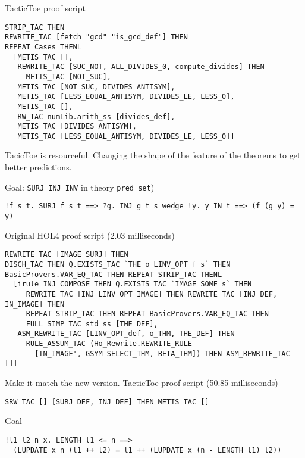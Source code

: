 \documentclass[runningheads,a4paper,draft]{svjour3}
\def\holfour{\textsf{HOL4}\xspace}
\def\tactictoe{\textsf{TacticToe}\xspace}
\begin{document}
\vspace{5mm}

\tactictoe proof script
\begin{lstlisting}[language=SMLSmall,frame=tb]
STRIP_TAC THEN 
REWRITE_TAC [fetch "gcd" "is_gcd_def"] THEN 
REPEAT Cases THENL 
  [METIS_TAC [], 
   REWRITE_TAC [SUC_NOT, ALL_DIVIDES_0, compute_divides] THEN 
     METIS_TAC [NOT_SUC], 
   METIS_TAC [NOT_SUC, DIVIDES_ANTISYM], 
   METIS_TAC [LESS_EQUAL_ANTISYM, DIVIDES_LE, LESS_0], 
   METIS_TAC [], 
   RW_TAC numLib.arith_ss [divides_def], 
   METIS_TAC [DIVIDES_ANTISYM],
   METIS_TAC [LESS_EQUAL_ANTISYM, DIVIDES_LE, LESS_0]]
\end{lstlisting}

TacicToe is resourceful. Changing the shape of the feature of the theorems
to get better predictions.

Goal: \texttt{SURJ\_INJ\_INV} in theory \texttt{pred\_set})
\begin{lstlisting}[language=SMLSmall,frame=tb]
!f s t. SURJ f s t ==> ?g. INJ g t s wedge !y. y IN t ==> (f (g y) = y)
\end{lstlisting}

Original \holfour proof script (2.03 milliseconds)
\begin{lstlisting}[language=SMLSmall,frame=tb]
REWRITE_TAC [IMAGE_SURJ] THEN
DISCH_TAC THEN Q.EXISTS_TAC `THE o LINV_OPT f s` THEN
BasicProvers.VAR_EQ_TAC THEN REPEAT STRIP_TAC THENL 
  [irule INJ_COMPOSE THEN Q.EXISTS_TAC `IMAGE SOME s` THEN
     REWRITE_TAC [INJ_LINV_OPT_IMAGE] THEN REWRITE_TAC [INJ_DEF, IN_IMAGE] THEN
     REPEAT STRIP_TAC THEN REPEAT BasicProvers.VAR_EQ_TAC THEN
     FULL_SIMP_TAC std_ss [THE_DEF],
   ASM_REWRITE_TAC [LINV_OPT_def, o_THM, THE_DEF] THEN
     RULE_ASSUM_TAC (Ho_Rewrite.REWRITE_RULE
       [IN_IMAGE', GSYM SELECT_THM, BETA_THM]) THEN ASM_REWRITE_TAC []]
\end{lstlisting}

\vspace{5mm}

Make it match the new version.
\tactictoe proof script (50.85 milliseconds)
\begin{lstlisting}[language=SMLSmall,frame=tb]
SRW_TAC [] [SURJ_DEF, INJ_DEF] THEN METIS_TAC []
\end{lstlisting}


Goal
\begin{lstlisting}[language=SMLSmall,frame=tb]
!l1 l2 n x. LENGTH l1 <= n ==> 
  (LUPDATE x n (l1 ++ l2) = l1 ++ (LUPDATE x (n - LENGTH l1) l2))
\end{lstlisting}
\end{document}
